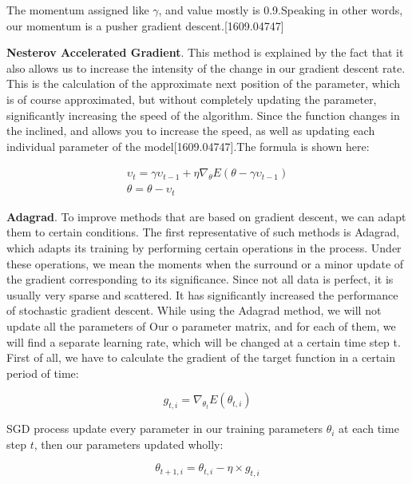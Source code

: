 \noindent The momentum assigned like $\gamma$, and value mostly is 0.9.Speaking in other words, our momentum is a pusher gradient descent.[1609.04747]


\noindent \textbf{Nesterov Accelerated Gradient}. This method is explained by the fact that it also allows us to increase the intensity of the change in our gradient descent rate. This is the calculation of the approximate next position of the parameter, which is of course approximated, but without completely updating the parameter, significantly increasing the speed of the algorithm. Since the function changes in the inclined, and allows you to increase the speed, as well as updating each individual parameter of the model[1609.04747].The formula is shown here:

\begin{equation}
	\begin{split}
		\upsilon_t = \gamma\upsilon_{t-1} + \eta\nabla_\theta E(\theta - \gamma\upsilon_{t-1}) \\
		\theta = \theta - \upsilon_t
	\end{split}
\end{equation}

\noindent \textbf{Adagrad}. To improve methods that are based on gradient descent, we can adapt them to certain conditions. The first representative of such methods is Adagrad, which adapts its training by performing certain operations in the process. Under these operations, we mean the moments when the surround or a minor update of the gradient corresponding to its significance. Since not all data is perfect, it is usually very sparse and scattered. It has significantly increased the performance of stochastic gradient descent. While using the Adagrad method, we will not update all the parameters of Our o parameter matrix, and for each of them, we will find a separate learning rate, which will be changed at a certain time step t. First of all, we have to calculate the gradient of the target function in a certain period of time:

\begin{equation}
	g_{t,i} = \nabla_{\theta_t} E(\theta_{t,i})
\end{equation}

\noindent SGD process update every parameter in our training parameters $\theta_i$ at each time step $t$, then our parameters updated wholly:

\begin{equation}
\theta_{t+1,i} = \theta_{t,i} - \eta \times g_{t,i}
\end{equation}

